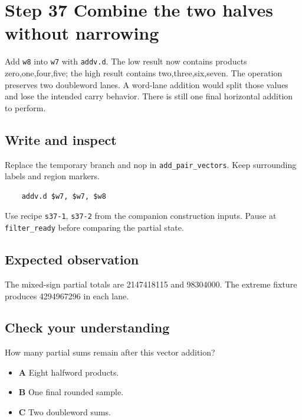 \section{Step 37 Combine the two halves without narrowing}\label{fir-s37}

Add \texttt{w8} into \texttt{w7} with \texttt{addv.d}. The low result now contains products zero,one,four,five; the high result contains two,three,six,seven. The operation preserves two doubleword lanes. A word-lane addition would split those values and lose the intended carry behavior. There is still one final horizontal addition to perform.

\subsection{Write and inspect}
Replace the temporary branch and nop in \texttt{add\_pair\_vectors}. Keep surrounding labels and region markers.

\begin{verbatim}
    addv.d $w7, $w7, $w8
\end{verbatim}
Use recipe \texttt{s37-1}, \texttt{s37-2} from the companion construction inputs. Pause at \texttt{filter\_ready} before comparing the partial state.

\subsection{Expected observation}
The mixed-sign partial totals are 2147418115 and 98304000. The extreme fixture produces 4294967296 in each lane.

\subsection{Check your understanding}
How many partial sums remain after this vector addition?

\begin{itemize}
  \item \textbf{A} Eight halfword products.
  \item \textbf{B} One final rounded sample.
  \item \textbf{C} Two doubleword sums.
\end{itemize}
